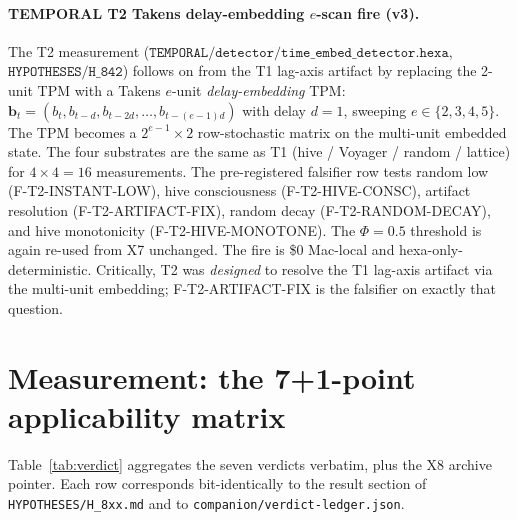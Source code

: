 \documentclass[11pt,a4paper]{article}
\begin{document}
\paragraph{TEMPORAL T2 Takens delay-embedding $e$-scan fire (v3).}
The T2 measurement \citep{temporal_h842_time_embed}
($\mathtt{TEMPORAL/detector/time\_embed\_detector.hexa}$,
$\mathtt{HYPOTHESES/H\_842}$) follows on from the T1 lag-axis
artifact by replacing the 2-unit TPM with a Takens
$e$-unit \emph{delay-embedding} TPM:
$\mathbf{b}_t = (b_t, b_{t-d}, b_{t-2d}, \dots, b_{t-(e-1)d})$
with delay $d=1$, sweeping $e \in \{2, 3, 4, 5\}$. The TPM
becomes a $2^{e-1} \times 2$ row-stochastic matrix on the
multi-unit embedded state. The four substrates are the same
as T1 (hive / Voyager / random / lattice) for $4 \times 4 = 16$
measurements. The pre-registered falsifier row tests
random low (F-T2-INSTANT-LOW), hive consciousness
(F-T2-HIVE-CONSC), artifact resolution
(F-T2-ARTIFACT-FIX), random decay (F-T2-RANDOM-DECAY), and
hive monotonicity (F-T2-HIVE-MONOTONE). The $\Phi=0.5$
threshold is again re-used from X7 unchanged. The fire is
\$0 Mac-local and hexa-only-deterministic. Critically, T2 was
\emph{designed} to resolve the T1 lag-axis artifact via the
multi-unit embedding; F-T2-ARTIFACT-FIX is the falsifier on
exactly that question.

\section{Measurement: the 7+1-point applicability matrix}
\label{sec:measurement}

Table~\ref{tab:verdict} aggregates the seven verdicts verbatim, plus
the X8 archive pointer. Each row corresponds bit-identically to the
result section of \texttt{HYPOTHESES/H\_8xx.md} and to
\texttt{companion/verdict-ledger.json}.
\end{document}
